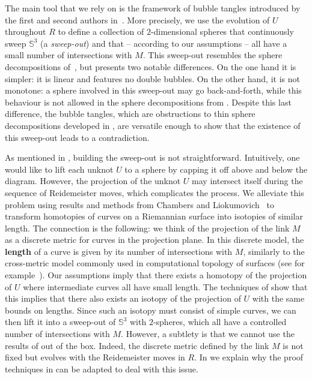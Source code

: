\documentclass{article}
\newcommand{\Sp}{\mathbb{S}}
\begin{document}
The main tool that we rely on is the framework of bubble tangles introduced by the first and second authors in~\cite{Lunel_spherewidth_out}. More precisely, we use the evolution of $U$ throughout $R$ to define a collection of $2$-dimensional spheres that continuously sweep $\Sp^3$ (a \textit{sweep-out}) and that -- according to our assumptions -- all have a small number of intersections with $M$. This sweep-out resembles the sphere decompositions of~\cite{Lunel_spherewidth_out}, but presents two notable differences. On the one hand it is simpler: it is linear and features no double bubbles. On the other hand, it is not monotone: a sphere involved in this sweep-out may go back-and-forth, while this behaviour is not allowed in the sphere decompositions from \cite{Lunel_spherewidth_out}. Despite this last difference, the bubble tangles, which are obstructions to thin sphere decompositions developed in \cite{Lunel_spherewidth_out}, are versatile enough to show that the existence of this sweep-out leads to a contradiction.

As mentioned in , building the sweep-out is not straightforward. Intuitively, one would like to lift each unknot $U$ to a sphere by capping it off above and below the diagram. However, the projection of the unknot $U$ may intersect itself during the sequence of Reidemeister moves, which complicates the process.
We alleviate this problem using results and methods from Chambers and Liokumovich~\cite{Chambers_homo-isotopy} to transform homotopies of curves on a Riemannian surface into isotopies of similar length. The connection is the following: we think of the projection of the link $M$ as a discrete metric for curves in the projection plane. In this discrete model, the \textbf{length} of a curve is given by its number of intersections with $M$, similarly to the cross-metric model commonly used in computational topology of surfaces (see for example~\cite{de2010tightening}). Our assumptions imply that there exists a homotopy of the projection of $U$ where intermediate curves all have small length. The techniques of \cite{Chambers_homo-isotopy} show that this implies that there also exists an isotopy of the projection of $U$ with the same bounds on lengths. Since such an isotopy must consist of simple curves, we can then lift it into a sweep-out of $\Sp^3$ with $2$-spheres, which all have a controlled number of intersections with $M$. However, a subtlety is that we cannot use the results of \cite{Chambers_homo-isotopy} out of the box. Indeed, the discrete metric defined by the link $M$ is not fixed but evolves with the Reidemeister moves in $R$. In  we explain why the proof techniques in \cite{Chambers_homo-isotopy} can be adapted to deal with this issue.
\end{document}
